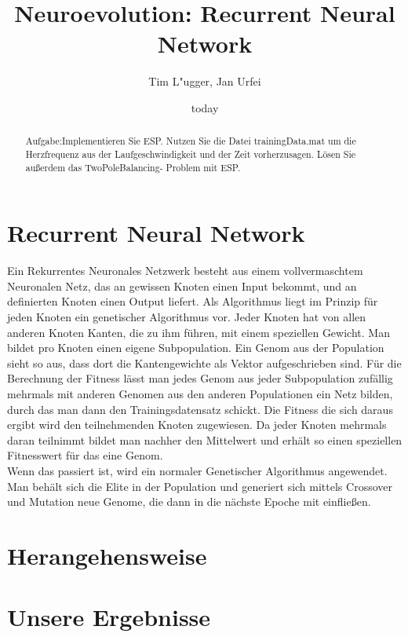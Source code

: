 \documentclass{hbrs-ecta-report}
\begin{document}

\title{Neuroevolution: Recurrent Neural Network}
\subtitle{}

\author{
\alignauthor
Tim L"ugger, Jan Urfei
}

\date{today}
\maketitle
\begin{abstract}
Aufgabe:Implementieren Sie ESP. Nutzen Sie die Datei trainingData.mat um die Herzfrequenz aus der Laufgeschwindigkeit und der Zeit vorherzusagen. Lösen Sie außerdem das TwoPoleBalancing- Problem mit ESP.
\end{abstract}

\section{Recurrent Neural Network}
Ein Rekurrentes Neuronales Netzwerk besteht aus einem vollvermaschtem Neuronalen Netz, das an gewissen Knoten einen Input bekommt, und an definierten Knoten einen Output liefert.
Als Algorithmus liegt im Prinzip für jeden Knoten ein genetischer Algorithmus vor. Jeder Knoten hat von allen anderen Knoten Kanten, die zu ihm führen, mit einem speziellen Gewicht. Man bildet pro Knoten einen eigene Subpopulation. Ein Genom aus der Population sieht so aus, dass dort die Kantengewichte als Vektor aufgeschrieben sind. Für die Berechnung der Fitness lässt man jedes Genom aus jeder Subpopulation zufällig mehrmals mit anderen Genomen aus den anderen Populationen ein Netz bilden, durch das man dann den Trainingsdatensatz schickt. Die Fitness die sich daraus ergibt wird den teilnehmenden Knoten zugewiesen. Da jeder Knoten mehrmals daran teilnimmt bildet man nachher den Mittelwert und erhält so einen speziellen Fitnesswert für das eine Genom.\\
Wenn das passiert ist, wird ein normaler Genetischer Algorithmus angewendet. Man behält sich die Elite in der Population und generiert sich mittels Crossover und Mutation neue Genome, die dann in die nächste Epoche mit einfließen. 


\section{Herangehensweise}
 



\section{Unsere Ergebnisse}
\end{document}
